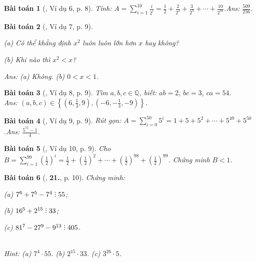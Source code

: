 \documentclass{article}
\numberwithin{equation}{section}
\newtheorem{baitoan}{Bài toán}
\DeclareRobustCommand{\divby}{%
	\mathrel{\vbox{\baselineskip.65ex\lineskiplimit0pt\hbox{.}\hbox{.}\hbox{.}}}%
}
\begin{document}
\begin{baitoan}[\cite{Binh_Toan_7_tap_1}, Ví dụ 6, p. 8]
	Tính: $A = \sum_{i=1}^{10} \frac{i}{2^i} = \frac{1}{2} + \frac{2}{2^2} + \frac{3}{2^3} + \cdots + \frac{10}{2^{10}}$.\hfill\textsf{Ans:} $\frac{509}{256}$.
\end{baitoan}

\begin{baitoan}[\cite{Binh_Toan_7_tap_1}, Ví dụ 7, p. 9]
	\begin{enumerate*}
		\item[(a)] Có thể khẳng định $x^2$ luôn luôn lớn hơn $x$ hay không?
		\item[(b)] Khi nào thì $x^2 < x$?
	\end{enumerate*}\hfill\textsf{Ans:} (a) Không. (b) $0 < x < 1$.
\end{baitoan}

\begin{baitoan}[\cite{Binh_Toan_7_tap_1}, Ví dụ 8, p. 9]
	Tìm $a,b,c\in\mathbb{Q}$, biết: $ab = 2$, $bc = 3$, $ca = 54$.\\\mbox{}\hfill\textsf{Ans:} $(a,b,c)\in\left\{\left(6,\frac{1}{3},9\right),\left(-6,-\frac{1}{3},-9\right)\right\}$.
\end{baitoan}

\begin{baitoan}[\cite{Binh_Toan_7_tap_1}, Ví dụ 9, p. 9]
	Rút gọn: $A = \sum_{i=0}^{50} 5^i = 1 + 5 + 5^2 + \cdots + 5^{49} + 5^{50}$.\hfill\textsf{Ans:} $\frac{5^{51} - 1}{4}$.
\end{baitoan}

\begin{baitoan}[\cite{Binh_Toan_7_tap_1}, Ví dụ 10, p. 9]
	Cho $B = \sum_{i=1}^{99} \left(\frac{1}{2}\right)^i = \frac{1}{2} + \left(\frac{1}{2}\right)^2 + \cdots + \left(\frac{1}{2}\right)^{98} + \left(\frac{1}{2}\right)^{99}$. Chứng minh $B < 1$.
\end{baitoan}

\begin{baitoan}[\cite{Binh_Toan_7_tap_1}, \textbf{21.}, p. 10]
	Chứng minh:
	\begin{enumerate*}
		\item[(a)] $7^6 + 7^5 - 7^4\divby 55$;
		\item[(b)] $16^5 + 2^{15}\divby 33$;
		\item[(c)] $81^7 - 27^9 - 9^{13}\divby 405$.
	\end{enumerate*}\\\mbox{}\hfill\textsf{Hint:} (a) $7^4\cdot 55$. (b) $2^{15}\cdot 33$. (c) $3^{26}\cdot 5$.
\end{baitoan}
\end{document}
